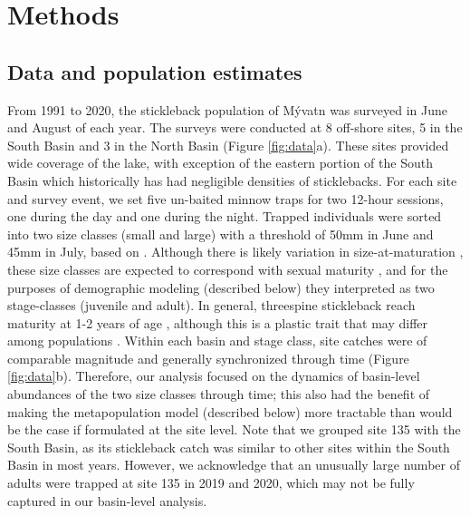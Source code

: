 \documentclass[11pt]{article}
\begin{document}
\section*{Methods}



\subsection*{Data and population estimates}

From 1991 to 2020,
the stickleback population of M\'{y}vatn was surveyed in June and August of each year.
The surveys were conducted at 8 off-shore sites,
5 in the South Basin and 3 in the North Basin
(Figure \ref{fig:data}a).
These sites provided wide coverage of the lake,
with exception of the eastern portion of the South Basin
which historically has had negligible densities of sticklebacks.
For each site and survey event,
we set five un-baited minnow traps for two 12-hour sessions,
one during the day and one during the night.
Trapped individuals were sorted into two size classes (small and large)
with a threshold of 50mm in June and 45mm in July, based on \citep{gislason1998}.
Although there is likely variation in size-at-maturation \citep{singkam2019},
these size classes are expected to correspond with sexual maturity
\citep{gudmundsson1996, gislason1998},
and for the purposes of demographic modeling (described below)
they interpreted as two stage-classes (juvenile and adult).
In general, threespine stickleback reach maturity at 1-2 years of age
\citep{baker2008overview},
although this is a plastic trait \citep{baker2015life}
that may differ among populations \citep{snyder1991migration}.
Within each basin and stage class,
site catches were of comparable magnitude and
generally synchronized through time (Figure \ref{fig:data}b).
Therefore, our analysis focused on the dynamics of basin-level abundances
of the two size classes through time;
this also had the benefit of making the metapopulation model (described below) more tractable
than would be the case if formulated at the site level.
Note that we grouped site 135 with the South Basin,
as its stickleback catch was similar to other sites within the South Basin in most years.
However,
we acknowledge that an unusually large number of adults were trapped at site 135
in 2019 and 2020, which may not be fully captured in our basin-level analysis.
\end{document}
